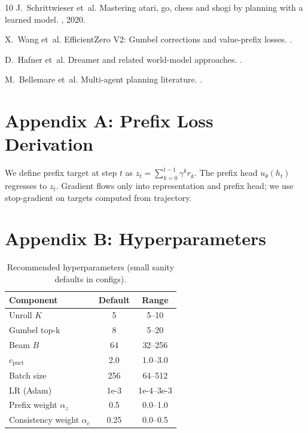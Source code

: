 \documentclass[10pt]{article}
\begin{document}

\begin{thebibliography}{10}
J.~Schrittwieser et~al.
\newblock Mastering atari, go, chess and shogi by planning with a learned model.
, 2020.

X.~Wang et~al.
\newblock EfficientZero V2: Gumbel corrections and value-prefix losses.
.

D.~Hafner et~al.
\newblock Dreamer and related world-model approaches.
.

M.~Bellemare et~al.
\newblock Multi-agent planning literature.
.
\end{thebibliography}

\appendix
\section{Appendix A: Prefix Loss Derivation}
We define prefix target at step $t$ as $z_t=\sum_{k=0}^{t-1}\gamma^k r_k$. The prefix head $u_\theta(h_t)$ regresses to $z_t$. Gradient flows only into representation and prefix head; we use stop-gradient on targets computed from trajectory.

\section{Appendix B: Hyperparameters}
\begin{table}[h]
\centering
\begin{tabular}{lcc}
\toprule
Component & Default & Range \\
\midrule
Unroll $K$ & 5 & 5--10 \\
Gumbel top-k & 8 & 5--20 \\
Beam $B$ & 64 & 32--256 \\
$c_{\text{puct}}$ & 2.0 & 1.0--3.0 \\
Batch size & 256 & 64--512 \\
LR (Adam) & 1e-3 & 1e-4--3e-3 \\
Prefix weight $\alpha_z$ & 0.5 & 0.0--1.0 \\
Consistency weight $\alpha_c$ & 0.25 & 0.0--0.5 \\
\bottomrule
\end{tabular}
\caption{Recommended hyperparameters (small sanity defaults in configs).}
\end{table}
\end{document}

